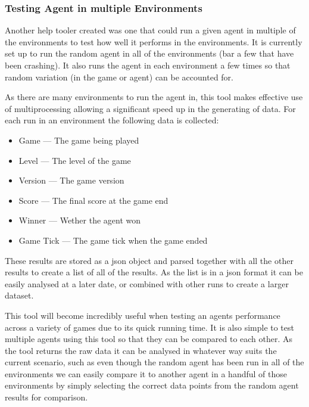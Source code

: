\documentclass[a4paper]{article}
\begin{document}
\subsubsection{Testing Agent in multiple Environments}
Another help tooler created was one that could run a given agent in multiple of the environments to test how well it performs in the environments.
It is currently set up to run the random agent in all of the environments (bar a few that have been crashing).
It also runs the agent in each environment a few times so that random variation (in the game or agent) can be accounted for.
\par
As there are many environments to run the agent in, this tool makes effective use of multiprocessing allowing a significant speed up in the generating of data.
For each run in an environment the following data is collected:
\begin{multicols}{2}
    \begin{itemize}[noitemsep,nolistsep]
        \item Game --- The game being played
        \item Level --- The level of the game
        \item Version --- The game version
        \item Score --- The final score at the game end
        \item Winner --- Wether the agent won
        \item Game Tick --- The game tick when the game ended
    \end{itemize}
\end{multicols}
These results are stored as a json object and parsed together with all the other results to create a list of all of the results.
As the list is in a json format it can be easily analysed at a later date, or combined with other runs to create a larger dataset.
\par
This tool will become incredibly useful when testing an agents performance across a variety of games due to its quick running time.
It is also simple to test multiple agents using this tool so that they can be compared to each other.
As the tool returns the raw data it can be analysed in whatever way suits the current scenario, such as even though the random agent has been run in all of the environments we can easily compare it to another agent in a handful of those environments by simply selecting the correct data points from the random agent results for comparison.
\end{document}
